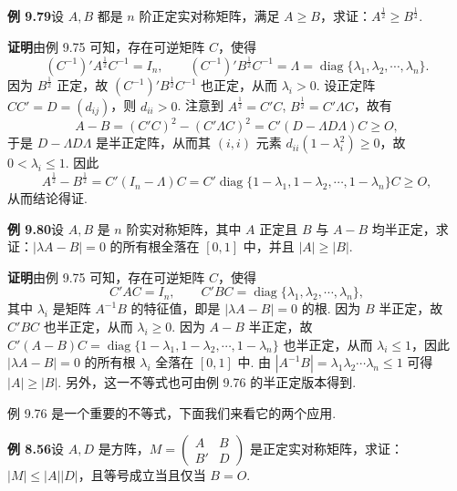 \documentclass[UTF8, 12pt, fontset=fandol, oneside]{ctexart}
\begin{document}
\noindent\textbf{例 9.79}\quad 设 $A,B$ 都是 $n$ 阶正定实对称矩阵，满足 $A\ge B$，求证：$A^{\frac12}\ge B^{\frac12}$.

\noindent\textbf{证明}\quad 由例 9.75 可知，存在可逆矩阵 $C$，使得
\[
(C^{-1})'A^{\frac12}C^{-1}=I_n,\qquad
(C^{-1})'B^{\frac12}C^{-1}=\Lambda=\operatorname{diag}\{\lambda_1,\lambda_2,\cdots,\lambda_n\}.
\]
因为 $B^{\frac12}$ 正定，故 $(C^{-1})'B^{\frac12}C^{-1}$ 也正定，从而 $\lambda_i>0$. 设正定阵 $CC'=D=(d_{ij})$，则 $d_{ii}>0$. 注意到 $A^{\frac12}=C'C$, $B^{\frac12}=C'\Lambda C$，故有
\[
A-B=(C'C)^2-(C'\Lambda C)^2=C'(D-\Lambda D\Lambda)C\ge O,
\]
于是 $D-\Lambda D\Lambda$ 是半正定阵，从而其 $(i,i)$ 元素 $d_{ii}(1-\lambda_i^2)\ge0$，故 $0<\lambda_i\le1$. 因此
\[
A^{\frac12}-B^{\frac12}=C'(I_n-\Lambda)C
=C'\operatorname{diag}\{1-\lambda_1,1-\lambda_2,\cdots,1-\lambda_n\}C\ge O,
\]
从而结论得证.

\noindent\textbf{例 9.80}\quad 设 $A,B$ 是 $n$ 阶实对称矩阵，其中 $A$ 正定且 $B$ 与 $A-B$ 均半正定，求证：$|\lambda A-B|=0$ 的所有根全落在 $[0,1]$ 中，并且 $|A|\ge |B|$.

\noindent\textbf{证明}\quad 由例 9.75 可知，存在可逆矩阵 $C$，使得
\[
C'AC=I_n,\qquad C'BC=\operatorname{diag}\{\lambda_1,\lambda_2,\cdots,\lambda_n\},
\]
其中 $\lambda_i$ 是矩阵 $A^{-1}B$ 的特征值，即是 $|\lambda A-B|=0$ 的根. 因为 $B$ 半正定，故 $C'BC$ 也半正定，从而 $\lambda_i\ge0$. 因为 $A-B$ 半正定，故 $C'(A-B)C=\operatorname{diag}\{1-\lambda_1,1-\lambda_2,\cdots,1-\lambda_n\}$ 也半正定，从而 $\lambda_i\le1$，因此 $|\lambda A-B|=0$ 的所有根 $\lambda_i$ 全落在 $[0,1]$ 中. 由 $|A^{-1}B|=\lambda_1\lambda_2\cdots\lambda_n\le1$ 可得 $|A|\ge |B|$. 另外，这一不等式也可由例 9.76 的半正定版本得到.

例 9.76 是一个重要的不等式，下面我们来看它的两个应用.

\noindent\textbf{例 8.56}\quad 设 $A,D$ 是方阵，$M=\begin{pmatrix}A&B\\B'&D\end{pmatrix}$ 是正定实对称矩阵，求证：$|M|\le |A||D|$，且等号成立当且仅当 $B=O$.
\end{document}
